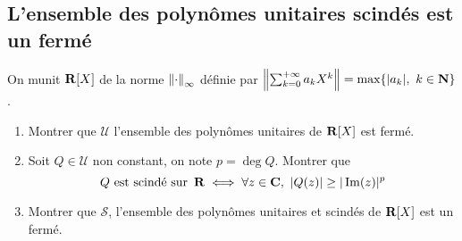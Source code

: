 \subsection{L'ensemble des polynômes unitaires scindés est un fermé}
\begin{exercice}
On munit $\operatorname{\mathbf{R}}[X]$ de la norme $\left\lVert \cdot\right\rVert_{\infty}$ définie par $\left\lVert \sum_{k=0}^{+\infty}a_kX^k\right\rVert=\text{max}\lbrace |a_k|,\ k\in\operatorname{\mathbf{N}}\rbrace$.
\begin{enumerate}
	\item Montrer que $\mathcal U$ l'ensemble des polynômes unitaires de $\operatorname{\mathbf{R}}[X]$ est fermé.
	\item Soit $Q\in\mathcal U$ non constant, on note $p=\deg Q$. Montrer que 
	\[Q\text{ est scindé sur }\operatorname{\mathbf{R}}\iff \forall z\in\operatorname{\mathbf{C}},\ |Q(z)|\geq |\operatorname{Im}(z)|^p\]
	\item Montrer que $\mathcal S$, l'ensemble des polynômes unitaires et scindés de $\operatorname{\mathbf{R}}[X]$ est un fermé.
\end{enumerate}
\end{exercice}



